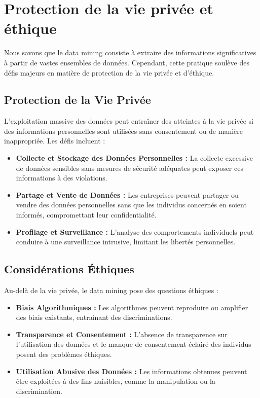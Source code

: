 \documentclass[a4paper,12pt]{report}
\begin{document}
	\section{Protection de la vie privée et éthique}
		Nous savons que le data mining consiste à extraire des informations significatives à partir de vastes ensembles de données. Cependant, cette pratique soulève des défis majeurs en matière de protection de la vie privée et d'éthique.

		\subsection{Protection de la Vie Privée}
		L'exploitation massive des données peut entraîner des atteintes à la vie privée si des informations personnelles sont utilisées sans consentement ou de manière inappropriée. Les défis incluent :
			\begin{itemize}
				\item \textbf{Collecte et Stockage des Données Personnelles :} La collecte excessive de données sensibles sans mesures de sécurité adéquates peut exposer ces informations à des violations.
				\item \textbf{Partage et Vente de Données :} Les entreprises peuvent partager ou vendre des données personnelles sans que les individus concernés en soient informés, compromettant leur confidentialité.
				\item \textbf{Profilage et Surveillance :} L'analyse des comportements individuels peut conduire à une surveillance intrusive, limitant les libertés personnelles.
			\end{itemize}

		\subsection{Considérations Éthiques}
		Au-delà de la vie privée, le data mining pose des questions éthiques :
			\begin{itemize}
				\item \textbf{Biais Algorithmiques :} Les algorithmes peuvent reproduire ou amplifier des biais existants, entraînant des discriminations.
				\item \textbf{Transparence et Consentement :} L'absence de transparence sur l'utilisation des données et le manque de consentement éclairé des individus posent des problèmes éthiques.
				\item \textbf{Utilisation Abusive des Données :} Les informations obtenues peuvent être exploitées à des fins nuisibles, comme la manipulation ou la discrimination.
			\end{itemize}
			
\end{document}
